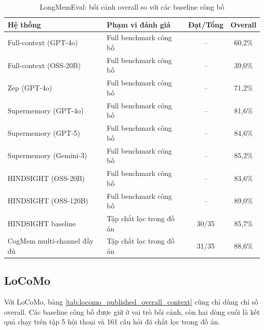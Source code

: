 \documentclass[../main.tex]{subfiles}
\begin{document}
\begin{table}[H]
\centering
\caption{LongMemEval: bối cảnh overall so với các baseline công bố}
\label{tab:longmemeval_published_overall_context}
\small
\begin{tabularx}{\linewidth}{@{}p{5.0cm}p{5.6cm}cc@{}}
\toprule
\textbf{Hệ thống} & \textbf{Phạm vi đánh giá} & \textbf{Đạt/Tổng} & \textbf{Overall} \\
\midrule
Full-context (GPT-4o) & Full benchmark công bố & -- & 60,2\% \\
Full-context (OSS-20B) & Full benchmark công bố & -- & 39,0\% \\
Zep (GPT-4o) & Full benchmark công bố & -- & 71,2\% \\
Supermemory (GPT-4o) & Full benchmark công bố & -- & 81,6\% \\
Supermemory (GPT-5) & Full benchmark công bố & -- & 84,6\% \\
Supermemory (Gemini-3) & Full benchmark công bố & -- & 85,2\% \\
HINDSIGHT (OSS-20B) & Full benchmark công bố & -- & 83,6\% \\
HINDSIGHT (OSS-120B) & Full benchmark công bố & -- & 89,0\% \\
\midrule
HINDSIGHT baseline & Tập chắt lọc trong đồ án & 30/35 & 85,7\% \\
CogMem multi-channel đầy đủ & Tập chắt lọc trong đồ án & 31/35 & 88,6\% \\
\bottomrule
\end{tabularx}
\end{table}

\subsection{LoCoMo}

Với LoCoMo, bảng \ref{tab:locomo_published_overall_context} cũng chỉ dùng chỉ số overall. Các baseline công bố được giữ ở vai trò bối cảnh, còn hai dòng cuối là kết quả chạy trên tập 5 hội thoại và 161 câu hỏi đã chắt lọc trong đồ án.
\end{document}
